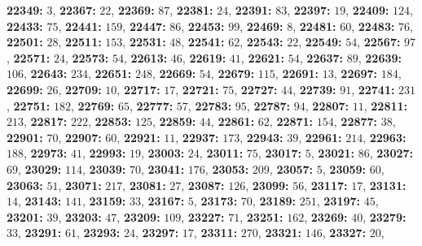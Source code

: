 \textsf{\bfseries 22349:} $3$, \textsf{\bfseries 22367:} $22$, \textsf{\bfseries 22369:} $87$, \textsf{\bfseries 22381:} $24$, \textsf{\bfseries 22391:} $83$, \textsf{\bfseries 22397:} $19$, \textsf{\bfseries 22409:} $124$, \textsf{\bfseries 22433:} $75$, \textsf{\bfseries 22441:} $159$, \textsf{\bfseries 22447:} $86$, \textsf{\bfseries 22453:} $99$, \textsf{\bfseries 22469:} $8$, \textsf{\bfseries 22481:} $60$, \textsf{\bfseries 22483:} $76$, \textsf{\bfseries 22501:} $28$, \textsf{\bfseries 22511:} $153$, \textsf{\bfseries 22531:} $48$, \textsf{\bfseries 22541:} $62$, \textsf{\bfseries 22543:} $22$, \textsf{\bfseries 22549:} $54$, \textsf{\bfseries 22567:} $97$, \textsf{\bfseries 22571:} $24$, \textsf{\bfseries 22573:} $54$, \textsf{\bfseries 22613:} $46$, \textsf{\bfseries 22619:} $41$, \textsf{\bfseries 22621:} $54$, \textsf{\bfseries 22637:} $89$, \textsf{\bfseries 22639:} $106$, \textsf{\bfseries 22643:} $234$, \textsf{\bfseries 22651:} $248$, \textsf{\bfseries 22669:} $54$, \textsf{\bfseries 22679:} $115$, \textsf{\bfseries 22691:} $13$, \textsf{\bfseries 22697:} $184$, \textsf{\bfseries 22699:} $26$, \textsf{\bfseries 22709:} $10$, \textsf{\bfseries 22717:} $17$, \textsf{\bfseries 22721:} $75$, \textsf{\bfseries 22727:} $44$, \textsf{\bfseries 22739:} $91$, \textsf{\bfseries 22741:} $231$, \textsf{\bfseries 22751:} $182$, \textsf{\bfseries 22769:} $65$, \textsf{\bfseries 22777:} $57$, \textsf{\bfseries 22783:} $95$, \textsf{\bfseries 22787:} $94$, \textsf{\bfseries 22807:} $11$, \textsf{\bfseries 22811:} $213$, \textsf{\bfseries 22817:} $222$, \textsf{\bfseries 22853:} $125$, \textsf{\bfseries 22859:} $44$, \textsf{\bfseries 22861:} $62$, \textsf{\bfseries 22871:} $154$, \textsf{\bfseries 22877:} $38$, \textsf{\bfseries 22901:} $70$, \textsf{\bfseries 22907:} $60$, \textsf{\bfseries 22921:} $11$, \textsf{\bfseries 22937:} $173$, \textsf{\bfseries 22943:} $39$, \textsf{\bfseries 22961:} $214$, \textsf{\bfseries 22963:} $188$, \textsf{\bfseries 22973:} $41$, \textsf{\bfseries 22993:} $19$, \textsf{\bfseries 23003:} $24$, \textsf{\bfseries 23011:} $75$, \textsf{\bfseries 23017:} $5$, \textsf{\bfseries 23021:} $86$, \textsf{\bfseries 23027:} $69$, \textsf{\bfseries 23029:} $114$, \textsf{\bfseries 23039:} $70$, \textsf{\bfseries 23041:} $176$, \textsf{\bfseries 23053:} $209$, \textsf{\bfseries 23057:} $5$, \textsf{\bfseries 23059:} $60$, \textsf{\bfseries 23063:} $51$, \textsf{\bfseries 23071:} $217$, \textsf{\bfseries 23081:} $27$, \textsf{\bfseries 23087:} $126$, \textsf{\bfseries 23099:} $56$, \textsf{\bfseries 23117:} $17$, \textsf{\bfseries 23131:} $14$, \textsf{\bfseries 23143:} $141$, \textsf{\bfseries 23159:} $33$, \textsf{\bfseries 23167:} $5$, \textsf{\bfseries 23173:} $70$, \textsf{\bfseries 23189:} $251$, \textsf{\bfseries 23197:} $45$, \textsf{\bfseries 23201:} $39$, \textsf{\bfseries 23203:} $47$, \textsf{\bfseries 23209:} $109$, \textsf{\bfseries 23227:} $71$, \textsf{\bfseries 23251:} $162$, \textsf{\bfseries 23269:} $40$, \textsf{\bfseries 23279:} $33$, \textsf{\bfseries 23291:} $61$, \textsf{\bfseries 23293:} $24$, \textsf{\bfseries 23297:} $17$, \textsf{\bfseries 23311:} $270$, \textsf{\bfseries 23321:} $146$, \textsf{\bfseries 23327:} $20$, 
